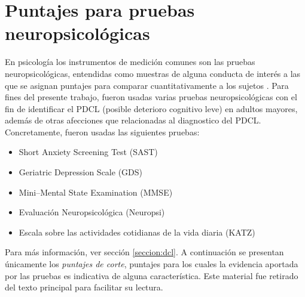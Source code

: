 \documentclass[12pt,letterpaper]{book}
\begin{document}
\appendix


\chapter{Puntajes para pruebas neuropsicológicas}
\label{apendice_pruebas}


En psicología los instrumentos de medición comunes son las pruebas neuropsicológicas, entendidas como muestras de alguna conducta de interés a las que se asignan puntajes para comparar cuantitativamente a los sujetos \cite{Ardila12}. 
%
%
Para fines del presente trabajo, fueron usadas varias pruebas neuropsicológicas con el fin de identificar el PDCL (posible deterioro cognitivo leve) en adultos mayores, además de otras afecciones que relacionadas al diagnostico del PDCL.
%
Concretamente, fueron usadas las siguientes pruebas:
\begin{itemize}
\item {Short Anxiety Screening Test (SAST)} 
\item {Geriatric Depression Scale (GDS)}
\item {Mini--Mental State Examination (MMSE)}
\item {Evaluación Neuropsicológica (Neuropsi)}
\item {Escala sobre las actividades cotidianas de la vida diaria (KATZ)}
\end{itemize}

Para más información, ver sección \ref{seccion:dcl}.
%
A continuación se presentan únicamente los \textit{puntajes de corte}, puntajes para los cuales la evidencia aportada por las pruebas es indicativa de alguna característica.
%
Este material fue retirado del texto principal para facilitar su lectura.
\end{document}
